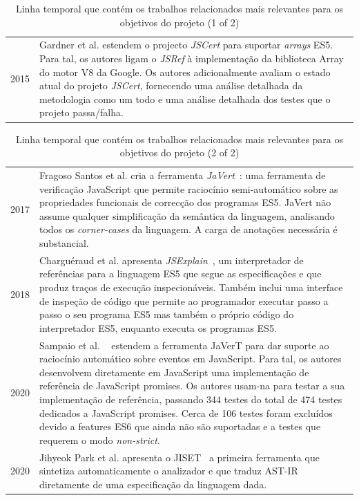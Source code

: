 \documentclass[runningheads]{llncs}
\begin{document}
\begin{table}[h!]
\begin{tabular}{@{\,}r <{\hskip 2pt} !{\makebox[0pt]{\textbullet}\hskip-0.5pt\vrule width 1pt\hspace{\labelsep}} >{\raggedright\arraybackslash}p{316pt}}
  2015 & Gardner et al. \cite{JSCert_1Year-2015}  estendem o projecto \emph{JSCert} para suportar \emph{arrays} ES5. Para tal, os autores ligam o \emph{JSRef} à implementação da biblioteca Array do motor V8 \cite{V8} da Google. Os autores adicionalmente avaliam o estado atual do projeto \emph{JSCert}, fornecendo uma análise detalhada da metodologia como um todo e uma análise detalhada dos testes que o projeto passa/falha.
\end{tabular}
\vspace{1em}
\caption{Linha temporal que contém os trabalhos relacionados mais relevantes para os objetivos do projeto (1 of 2)}
\label{tab:related-work_timeline-1}
\end{table}
\vspace{-2em}

\begin{table}[h!]
\renewcommand{\arraystretch}{1.8}
\begin{tabular}{@{\,}r <{\hskip 2pt} !{\makebox[0pt]{\textbullet}\hskip-0.5pt\vrule width 1pt\hspace{\labelsep}} >{\raggedright\arraybackslash}p{316pt}}
  
  2017 & Fragoso Santos et al. cria a ferramenta \emph{JaVert}~\cite{Javert-2017}: uma ferramenta de verificação JavaScript que permite raciocínio semi-automático sobre as propriedades funcionais de correcção dos programas ES5. JaVert não assume qualquer simplificação da semântica da linguagem, analisando todos os \emph{corner-cases} da linguagem. A carga de anotações necessária é substancial.\\
  2018 & Charguéraud et al. apresenta \emph{JSExplain}~\cite{JSExplain-2018}, um interpretador de referências para a linguagem ES5 que segue as especificações e que produz traços de execução inspecionáveis. Também inclui uma interface de inspeção de código que permite ao programador executar passo a passo o seu programa ES5 mas também o próprio código do interpretador ES5, enquanto executa os programas ES5.  \\
  2020 & Sampaio et al. ~\cite{Javert-2020} estendem a ferramenta JaVerT para dar suporte ao raciocínio automático sobre eventos em JavaScript. Para tal, os autores desenvolvem diretamente em JavaScript uma implementação de referência de JavaScript promises. Os autores usam-na para testar a sua implementação de referência, passando 344 testes do total de 474 testes dedicados a JavaScript promises. Cerca de 106 testes foram excluídos devido a features ES6 que ainda não são suportadas e a testes que requerem o modo \emph{non-strict}.\\
  2020 & Jihyeok Park et al. apresenta o JISET~\cite{JISET-2020} a primeira ferramenta que sintetiza automaticamente o analizador e que traduz AST-IR diretamente de uma especificação da linguagem dada.
\end{tabular}
\vspace{1em}
\caption{Linha temporal que contém os trabalhos relacionados mais relevantes para os objetivos do projeto (2 of 2)}
\label{tab:related-work_timeline-2}
\end{table}
\end{document}

